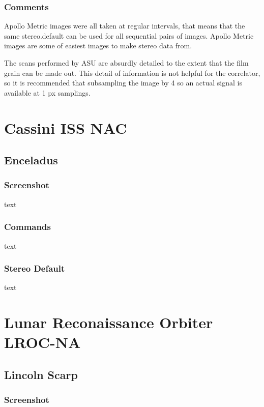\subsubsection*{Comments}

Apollo Metric images were all taken at regular intervals, that means
that the same stereo.default can be used for all sequential pairs of
images. Apollo Metric images are some of easiest images to make stereo
data from.

The scans performed by ASU are absurdly detailed to the extent that the
film grain can be made out. This detail of information is not helpful
for the correlator, so it is recommended that subsampling the image by
4 so an actual signal is available at 1 px samplings.

\section{Cassini ISS NAC}

\subsection{Enceladus}

\subsubsection*{Screenshot}

text

\subsubsection*{Commands}

text

\subsubsection*{Stereo Default}

text

\section{Lunar Reconaissance Orbiter LROC-NA}

\subsection{Lincoln Scarp}

\subsubsection*{Screenshot}

